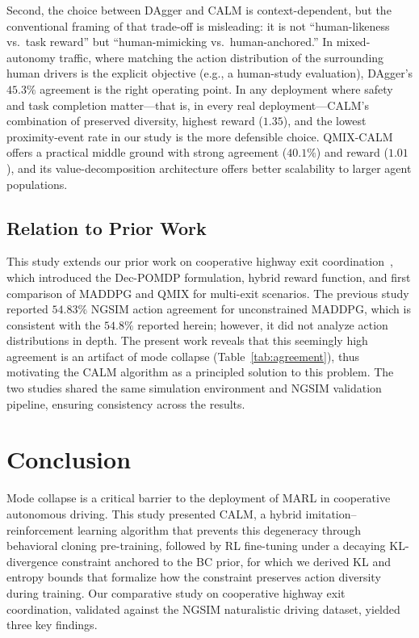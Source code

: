\documentclass[journal]{IEEEtran}
\begin{document}
Second, the choice between DAgger and CALM is context-dependent, but the conventional framing of that trade-off is misleading: it is not ``human-likeness vs.\ task reward'' but ``human-mimicking vs.\ human-anchored.'' In mixed-autonomy traffic, where matching the action distribution of the surrounding human drivers is the explicit objective (e.g., a human-study evaluation), DAgger's $45.3\%$ agreement is the right operating point. In any deployment where safety and task completion matter---that is, in every real deployment---CALM's combination of preserved diversity, highest reward ($1.35$), and the lowest proximity-event rate in our study is the more defensible choice. QMIX-CALM offers a practical middle ground with strong agreement ($40.1\%$) and reward ($1.01$), and its value-decomposition architecture offers better scalability to larger agent populations.

\subsection{Relation to Prior Work}

This study extends our prior work on cooperative highway exit coordination~\cite{jeragh2026coex}, which introduced the Dec-POMDP formulation, hybrid reward function, and first comparison of MADDPG and QMIX for multi-exit scenarios. The previous study reported $54.83\%$ NGSIM action agreement for unconstrained MADDPG, which is consistent with the $54.8\%$ reported herein; however, it did not analyze action distributions in depth. The present work reveals that this seemingly high agreement is an artifact of mode collapse (Table~\ref{tab:agreement}), thus motivating the CALM algorithm as a principled solution to this problem. The two studies shared the same simulation environment and NGSIM validation pipeline, ensuring consistency across the results.

\section{Conclusion}
\label{sec:conclusion}

Mode collapse is a critical barrier to the deployment of MARL in cooperative autonomous driving. This study presented CALM, a hybrid imitation--reinforcement learning algorithm that prevents this degeneracy through behavioral cloning pre-training, followed by RL fine-tuning under a decaying KL-divergence constraint anchored to the BC prior, for which we derived KL and entropy bounds that formalize how the constraint preserves action diversity during training. Our comparative study on cooperative highway exit coordination, validated against the NGSIM naturalistic driving dataset, yielded three key findings.
\end{document}
